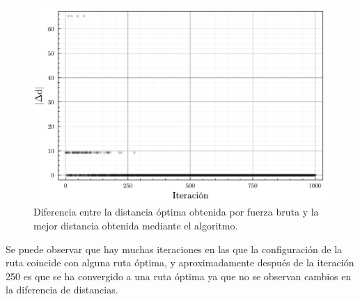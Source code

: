 \begin{figure}[ht!]
    \centering
    \includegraphics[scale=0.5]{../figures/delta_distances_cities_05.pdf}
    \caption{Diferencia entre la distancia óptima obtenida por fuerza bruta y la mejor distancia obtenida mediante el algoritmo.}
    \label{fig:delta_distances_cities_05}
\end{figure}

Se puede observar que hay muchas iteraciones en las que la configuración de la ruta coincide con alguna ruta óptima, y aproximadamente después de la iteración 250 es que se ha convergido a una ruta óptima ya que no se observan cambios en la diferencia de distancias.

